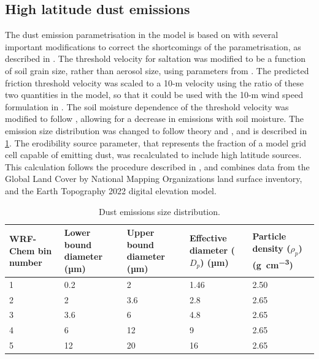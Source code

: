     \subsection{High latitude dust emissions}
    \label{sec:dust_emiss}
    The dust emission parametrisation in the model is based on \citet{ginoux_long-term_2004} with several important modifications to correct the shortcomings of the parametrisation, as described in \citet{legrand_afwa_2019}. 
    The threshold velocity for saltation was modified to be a function of soil grain size, rather than aerosol size, using parameters from \citet{legrand_afwa_2019}. 
    The predicted friction threshold velocity was scaled to a 10-m velocity using the ratio of these two quantities in the model, so that it could be used with the 10-m wind speed formulation in \citet{ginoux_long-term_2004}. The soil moisture dependence of the threshold velocity was modified to follow \citet{fecan_parametrization_1999}, allowing for a decrease in emissions with soil moisture.
    The emission size distribution was changed to follow \citet{kok_scaling_2011} theory and \citet{legrand_afwa_2019}, and is described in \cref{tab:dust_bins}.
    The erodibility source parameter, that represents the fraction of a model grid cell capable of emitting dust, was recalculated to include high latitude sources. This calculation follows the procedure described in \citet{groot_zwaaftink_substantial_2016}, and combines data from the Global Land Cover by National Mapping Organizations \citep[GLCNMO,][]{national_mapping_organizations_global_2025} land surface inventory, and the Earth Topography 2022 \citep[ETOPO,][]{noaa_national_centers_for_environmental_information_etopo_2022} digital elevation model.
    
    \begin{table}[ht!]
        \caption{Dust emissions size distribution.}
        \centering
        \begin{tabular}{m{1.5cm}|m{2cm}m{2cm}m{2cm}m{2cm}}
        \toprule
        WRF-Chem bin number & Lower bound diameter (µm)  &  Upper bound diameter (µm) & Effective diameter ($D_{p}$) (µm) & Particle density ($\rho_{p}$) (\si{\gram\per\cubic\cm}) \\
        \midrule
        1 & 0.2 & 2 & 1.46 & 2.50 \\
        2 & 2 & 3.6 & 2.8 & 2.65 \\
        3 & 3.6 & 6 & 4.8 & 2.65 \\
        4 & 6 & 12 & 9 & 2.65 \\
        5 & 12 & 20 & 16 & 2.65 \\
        \bottomrule
        \end{tabular}
        \label{tab:dust_bins}
    \end{table}
     
